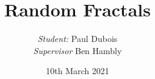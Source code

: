 \documentclass{beamer}
\begin{document}
	
	\title{Random Fractals}
	\author{
		\textit{Student:} Paul Dubois\\
		\textit{Supervisor} Ben Hambly
	}
	\date{10th March 2021}
	
	
	\begin{frame}[plain]
	    \titlepage
	\end{frame}
	
	
\end{document}

